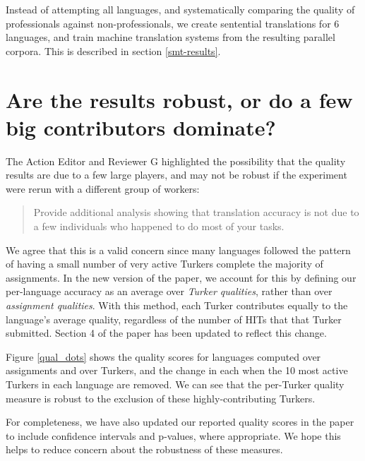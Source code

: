 \documentclass[11pt]{article}
\begin{document}
Instead of attempting all languages, and systematically comparing the quality of professionals against non-professionals, we create sentential translations for 6 languages, and train machine translation systems from the resulting parallel corpora.  This is described in section \ref{smt-results}.

\section{Are the results robust, or do a few big contributors dominate?}

The Action Editor and Reviewer G highlighted the possibility that the quality results are due to a few large players, and may not be robust if the experiment were rerun with a different group of workers: 
\begin{quote}
Provide additional analysis showing that translation accuracy is not due to a few individuals who happened to do most of your tasks.
\end{quote}

We agree that this is a valid concern since many languages followed the pattern of having a small number of very active Turkers complete the majority of assignments. In the new version of the paper, we account for this by defining our per-language accuracy as an average over {\it Turker qualities}, rather than over {\it assignment qualities}. With this method, each Turker contributes equally to the language's average quality, regardless of the number of HITs that that Turker submitted. Section 4 of the paper has been updated to reflect this change. 

Figure \ref{qual_dots} shows the quality scores for languages computed over assignments and over Turkers, and the change in each when the 10 most active Turkers in each language are removed. We can see that the per-Turker quality measure is robust to the exclusion of these highly-contributing Turkers. 

For completeness, we have also updated our reported quality scores in the paper to include confidence intervals and p-values, where appropriate. We hope this helps to reduce concern about the robustness of these measures.
\end{document}
